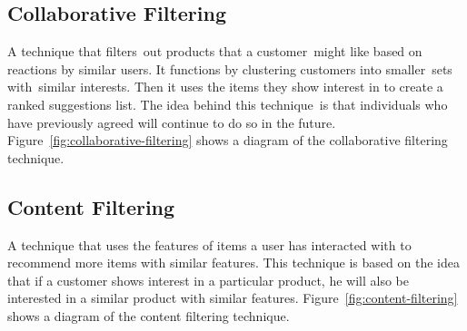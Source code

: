 \subsection{Collaborative Filtering}
A technique that filters out products that a customer might like based on reactions by similar users. It functions by clustering customers into smaller sets with similar interests. Then it uses the items they show interest in to create a ranked suggestions list. The idea behind this technique is that individuals who have previously agreed will continue to do so in the future. Figure~\ref{fig:collaborative-filtering} shows a diagram of the collaborative filtering technique.

\subsection{Content Filtering}
A technique that uses the features of items a user has interacted with to recommend more items with similar features. This technique is based on the idea that if a customer shows interest in a particular product, he will also be interested in a similar product with similar features. Figure~\ref{fig:content-filtering} shows a diagram of the content filtering technique. \\




